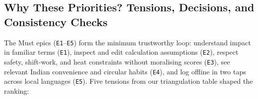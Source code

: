 \documentclass[12pt, a4paper]{article}
\begin{document}
\subsection{Why These Priorities? Tensions, Decisions, and Consistency Checks}

The Must epics (\texttt{E1}--\texttt{E5}) form the minimum trustworthy loop: understand impact in familiar terms (\texttt{E1}), inspect and edit calculation assumptions (\texttt{E2}), respect safety, shift-work, and heat constraints without moralising scores (\texttt{E3}), see relevant Indian convenience and circular habits (\texttt{E4}), and log offline in two taps across local languages (\texttt{E5}). Five tensions from our triangulation table shaped the ranking:
\end{document}
